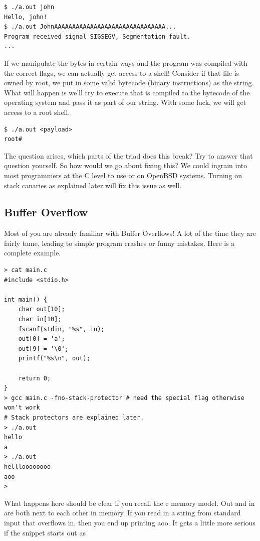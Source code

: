 \begin{lstlisting}
$ ./a.out john
Hello, john!
$ ./a.out JohnAAAAAAAAAAAAAAAAAAAAAAAAAAAAAAA...
Program received signal SIGSEGV, Segmentation fault.
...
\end{lstlisting}

If we manipulate the bytes in certain ways and the program was compiled with the correct flags, we can actually get access to a shell!
Consider if that file is owned by root, we put in some valid bytecode (binary instructions) as the string.
What will happen is we'll try to execute  that is compiled to the bytecode of the operating system and pass it as part of our string.
With some luck, we will get access to a root shell.

\begin{lstlisting}
$ ./a.out <payload>
root#
\end{lstlisting}

The question arises, which parts of the triad does this break?
Try to answer that question yourself.
So how would we go about fixing this?
We could ingrain into most programmers at the C level to use  or  on OpenBSD systems.
Turning on stack canaries as explained later will fix this issue as well.

\subsection{Buffer Overflow}

Most of you are already familiar with Buffer Overflows!
A lot of the time they are fairly tame, leading to simple program crashes or funny mistakes.
Here is a complete example.

\begin{lstlisting}
> cat main.c
#include <stdio.h>

int main() {
    char out[10];
    char in[10];
    fscanf(stdin, "%s", in);
    out[0] = 'a';
    out[9] = '\0';
    printf("%s\n", out);

    return 0;
}
> gcc main.c -fno-stack-protector # need the special flag otherwise won't work
# Stack protectors are explained later.
> ./a.out
hello
a
> ./a.out
hellloooooooo
aoo
>
\end{lstlisting}

What happens here should be clear if you recall the c memory model.
Out and in are both next to each other in memory.
If you read in a string from standard input that overflows in, then you end up printing aoo.
It gets a little more serious if the snippet starts out as

